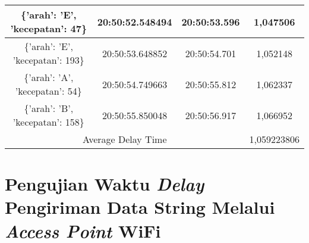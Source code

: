 \begin{table}[H]
\begin{tabular}{|ccc|c|}
    \multicolumn{1}{|c|}{\{'arah': 'E', 'kecepatan': 47\}}  & \multicolumn{1}{c|}{20:50:52.548494} & 20:50:53.596       & 1,047506    \\ \hline
    \multicolumn{1}{|c|}{\{'arah': 'E', 'kecepatan': 193\}} & \multicolumn{1}{c|}{20:50:53.648852} & 20:50:54.701       & 1,052148    \\ \hline
    \multicolumn{1}{|c|}{\{'arah': 'A', 'kecepatan': 54\}}  & \multicolumn{1}{c|}{20:50:54.749663} & 20:50:55.812       & 1,062337    \\ \hline
    \multicolumn{1}{|c|}{\{'arah': 'B', 'kecepatan': 158\}} & \multicolumn{1}{c|}{20:50:55.850048} & 20:50:56.917       & 1,066952    \\ \hline
    \multicolumn{3}{|c|}{Average Delay Time}                                                                            & 1,059223806 \\ \hline
  \end{tabular}
\end{table}

\section{Pengujian Waktu \emph{Delay} Pengiriman Data String Melalui \emph{Access Point} WiFi}
\label{sec:delayWiFi}

